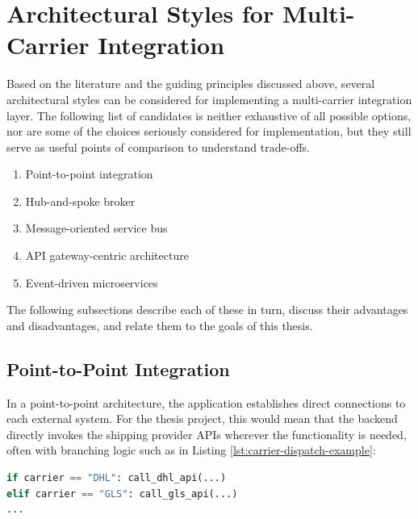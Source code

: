 \documentclass{imc-inf}
\begin{document}
\section{Architectural Styles for Multi-Carrier Integration}

Based on the literature and the guiding principles discussed above, several architectural styles can be considered for implementing a multi-carrier integration layer.
The following list of candidates is neither exhaustive of all possible options, nor are some of the choices seriously considered for implementation, but they still serve as useful points of comparison to understand trade-offs.

\begin{enumerate}[label=\arabic*., left=0pt, itemsep=3pt]
  \item Point-to-point integration
  \item Hub-and-spoke broker
  \item Message-oriented service bus
  \item API gateway-centric architecture
  \item Event-driven microservices
\end{enumerate}

The following subsections describe each of these in turn, discuss their advantages and disadvantages, and relate them to the goals of this thesis.

\subsection{Point-to-Point Integration}
In a point-to-point architecture, the application establishes direct connections to each external system. For the thesis project, this would mean that the backend directly invokes the shipping provider APIs wherever the functionality is needed, often with branching logic such as in Listing \ref{lst:carrier-dispatch-example}:

\begin{lstlisting}[language=Python,caption={Point-to-point integration example pseudocode},label=lst:carrier-dispatch-example]
if carrier == "DHL": call_dhl_api(...)
elif carrier == "GLS": call_gls_api(...)
...
\end{lstlisting}
\end{document}
